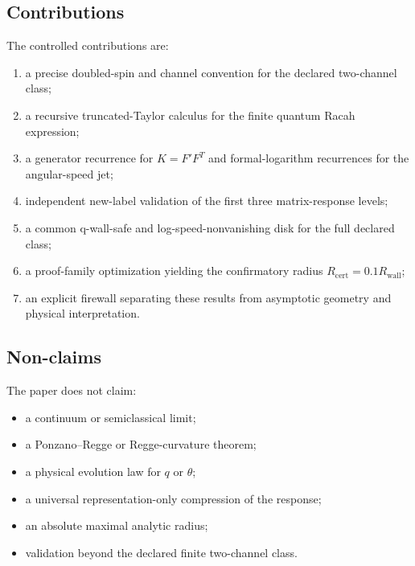 \subsection{Contributions}
The controlled contributions are:
\begin{enumerate}[leftmargin=2em]
\item a precise doubled-spin and channel convention for the declared two-channel class;
\item a recursive truncated-Taylor calculus for the finite quantum Racah expression;
\item a generator recurrence for $K=F'F^T$ and formal-logarithm recurrences for the angular-speed jet;
\item independent new-label validation of the first three matrix-response levels;
\item a common q-wall-safe and log-speed-nonvanishing disk for the full declared class;
\item a proof-family optimization yielding the confirmatory radius $R_{\mathrm{cert}}=0.1R_{\mathrm{wall}}$;
\item an explicit firewall separating these results from asymptotic geometry and physical interpretation.
\end{enumerate}

\subsection{Non-claims}
The paper does not claim:
\begin{itemize}[leftmargin=2em]
\item a continuum or semiclassical limit;
\item a Ponzano--Regge or Regge-curvature theorem;
\item a physical evolution law for $q$ or $\theta$;
\item a universal representation-only compression of the response;
\item an absolute maximal analytic radius;
\item validation beyond the declared finite two-channel class.
\end{itemize}
